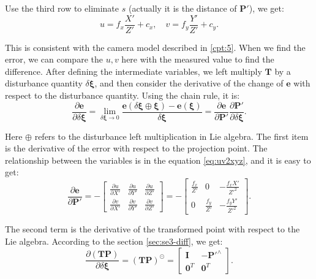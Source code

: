 Use the third row to eliminate $s$ (actually it is the distance of $\mathbf{P}'$), we get:
\begin{equation}
\label{eq:uv2xyz}
u = {f_x}\frac{{X'}}{{Z'}} + {c_x}, \quad v = {f_y}\frac{{Y'}}{{Z'}} + {c_y}.
\end{equation}

This is consistent with the camera model described in \ref{cpt:5}. When we find the error, we can compare the $u, v$ here with the measured value to find the difference. After defining the intermediate variables, we left multiply $\mathbf{T}$ by a disturbance quantity $\delta \boldsymbol{\xi}$, and then consider the derivative of the change of $\mathbf{e}$ with respect to the disturbance quantity. Using the chain rule, it is:
\begin{equation}
\frac{{\partial \mathbf{e}}}{{\partial \delta \boldsymbol{\xi} }} = \mathop {\lim }\limits_{\delta \boldsymbol{\xi}  \to 0} \frac{{\mathbf{e}\left( {\delta \boldsymbol{\xi}  \oplus \boldsymbol{\xi} } \right)-\mathbf{e}(\boldsymbol{\xi})}}{{\delta \boldsymbol{\xi} }}  = \frac{{\partial \mathbf{e}}}{{\partial \mathbf{P}'}}\frac{{\partial \mathbf{P}'}}{{\partial \delta \boldsymbol{\xi} }}.
\end{equation}

Here $\oplus$ refers to the disturbance left multiplication in Lie algebra. The first item is the derivative of the error with respect to the projection point. The relationship between the variables is in the equation \eqref{eq:uv2xyz}, and it is easy to get:
\begin{equation}
\frac{{\partial \mathbf{e}}}{{\partial \mathbf{P}'}} = -\left[ 
{\begin{array}{*{20}{c}}
	{\frac{{\partial u}}{{\partial X'}}}&{\frac{{\partial u}}{{\partial Y'}}}&{\frac{{\partial u}}{{\partial Z'}}}\\
	{\frac{{\partial v}}{{\partial X'}}}&{\frac{{\partial v}}{{\partial Y'}}}&{\frac{{\partial v}}{{\partial Z'}}}
	\end{array}} \right] 
= - \left[ {\begin{array}{*{20}{c}}
	{\frac{{{f_x}}}{Z'}}&0&{ - \frac{{{f_x}X'}}{{{Z'^2}}}}\\
	0&{\frac{{{f_y}}}{Z'}}&{ - \frac{{{f_y}Y'}}{Z'^2}}
\end{array}} \right].
\end{equation}

The second term is the derivative of the transformed point with respect to the Lie algebra. According to the section \ref{sec:se3-diff}, we get:
\begin{equation}
\frac{{\partial \left( \mathbf{TP} \right)}}{{\partial \delta \boldsymbol{\xi} }} = {\left( \mathbf{TP} \right)^ \odot } = \left[ 
\begin{array}{*{20}{cc}}
\mathbf{I} &- \mathbf{P}'^ \wedge \\
\mathbf{0}^T &\mathbf{0}^T 
\end{array}
\right].
\end{equation}


